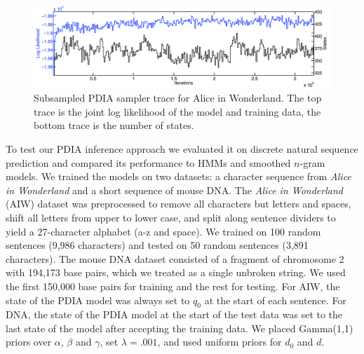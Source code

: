 \begin{figure}[htbp]
\centering
\includegraphics[width=1\textwidth]{results/aiw_sampler_trace}
\caption{Subsampled PDIA sampler trace for Alice in Wonderland.  The top trace is the joint log likelihood of the model and training data, the bottom trace is the number of states. \label{fig:aiw_sampler_trace}}
\end{figure}
%
To test our PDIA inference approach we evaluated it on discrete natural sequence prediction and compared its performance to HMMs and smoothed $n$-gram models.  We trained the models on two datasets: a character sequence from {\em Alice in Wonderland} \cite{Carroll1865} and a short sequence of mouse DNA.  The {\em Alice in Wonderland} (AIW) dataset was preprocessed to remove all characters but letters and spaces, shift all letters from upper to lower case, and split along sentence dividers to yield a 27-character alphabet (a-z and space).  We trained on 100 random sentences (9,986 characters) and tested on 50 random sentences (3,891 characters).   The mouse DNA dataset consisted of a fragment of chromosome 2 with 194,173 base pairs, which we treated as a single unbroken string.  We used the first 150,000 base pairs for training and the rest for testing.  For AIW, the state of the PDIA model was always set to $q_0$ at the start of each sentence.  For DNA, the state of the PDIA model at the start of the test data was set to the last state of the model after accepting the training data.  We placed Gamma(1,1) priors over $\alpha$, $\beta$ and $\gamma$, set $\lambda=.001$, and used uniform priors for $d_0$ and $d$.


